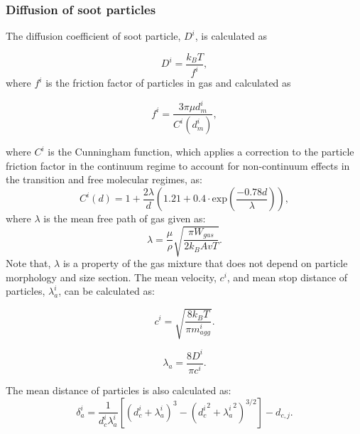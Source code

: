 \subsubsection{Diffusion of soot particles}
The diffusion coefficient of soot particle, $D^i$, is calculated as

\begin{equation}
	D^i = \frac{k_B T}{f^i}
	\label{eqn:diff},
\end{equation}
   \noindent where $f^i$ is the friction factor of particles in gas and calculated as

\begin{equation}
	f^i = \frac{3\pi\mu d^i_m}{C^i(d^i_m)},
	\label{eqn:fraction}
\end{equation}

   \noindent where ${C^i}$ is the Cunningham function, which applies a correction to the particle friction factor in the continuum regime to account for non-continuum effects in the transition and free molecular regimes, as: 
\begin{equation}
	C^i(d) = 1+\frac{2\lambda}{d}
	\left(
	1.21+0.4\cdot\mathrm{exp}(\frac{-0.78d}{\lambda})
	\right)
	\label{eqn:cun},
\end{equation}
  \noindent  where $\lambda$ is the mean free path of gas given as:
\begin{equation}
	\lambda = \frac{\mu}{\rho}\sqrt{\frac{\pi W_{gas}}{2k_B Av T}}
	\label{eqn:lambda}.
\end{equation}
 Note that, $\lambda$ is a property of the gas mixture that does not depend on particle morphology and size section. The mean velocity, ${c^i}$, and mean stop distance of particles, ${\lambda^i_a}$, can be calculated as:

\begin{equation}
	c^i = \sqrt{\frac{8k_B T}{\pi m^i_{agg}}}
	\label{eqn:meanvel}.
\end{equation}

\begin{equation}
	\lambda_a = \frac{8D^i}{\pi c^i}
	\label{eqn:stopdist}.
\end{equation}

 The mean distance of particles is also calculated as:
\begin{equation}
	\delta^i_a=\frac{1}{d^i_c\lambda^i_a}
	\left[
		\left(
			d^i_c+\lambda^i_a
		\right)^3
		-\left(
			{d^i_c}^2+{\lambda^i_a}^2
		\right)^{3 / 2}
	\right]
	-d_{c, j}    
	\label{eqn:meandist}.
\end{equation}

